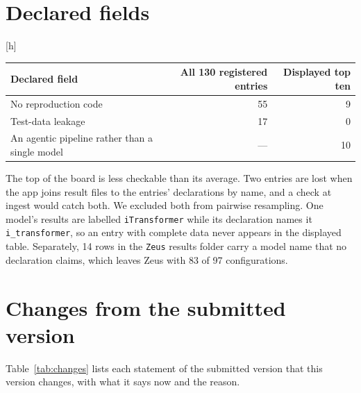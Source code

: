 \documentclass{article}
\makeatletter
\renewenvironment{table}
  {\setlength{\abovecaptionskip}{6\p@}%
   \setlength{\belowcaptionskip}{\z@}%
   \@float{table}}
  {\end@float}
\makeatother
\begin{document}
\section{Declared fields}
\label{app:census}

\begin{table}[h]
\centering
\small
\begin{tabular}{@{}lrr@{}}
\toprule
\textbf{Declared field} & \textbf{All 130 registered entries} & \textbf{Displayed top ten} \\
\midrule
No reproduction code & 55 & 9 \\
Test-data leakage & 17 & 0 \\
An agentic pipeline rather than a single model & --- & 10 \\
\bottomrule
\end{tabular}
\caption{Fields that each entry declares about itself in the pinned snapshot, which the board
does not audit. The model-type field was counted only for the displayed top ten.}
\label{tab:census}
\end{table}

The top of the board is less checkable than its average. Two entries are lost when the app
joins result files to the entries' declarations by name, and a check at ingest would catch
both. We excluded both from pairwise resampling. One model's results are labelled
\texttt{iTransformer} while its declaration names it \texttt{i\_transformer}, so an entry with
complete data never appears in the displayed table. Separately, 14 rows in the \texttt{Zeus}
results folder carry a model name that no declaration claims, which leaves Zeus with 83 of 97
configurations.


\section{Changes from the submitted version}
\label{app:changes}

Table~\ref{tab:changes} lists each statement of the submitted version that this version
changes, with what it says now and the reason.
\end{document}
